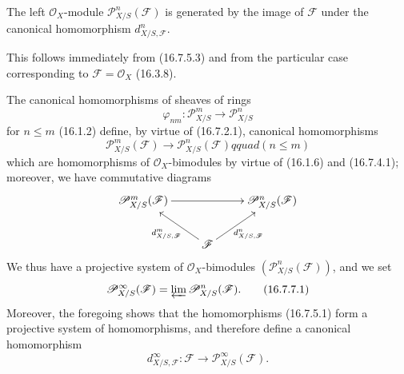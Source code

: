 \begin{proposition}[16.7.6]
\label{IV.16.7.6}
The left $\mathcal{O}_X$-module $\mathscr{P}_{X/S}^n(\mathscr{F})$ is
generated by the image of $\mathscr{F}$ under the canonical homomorphism
$d_{X/S,\mathscr{F}}^n$.
\end{proposition}

This follows immediately from (16.7.5.3) and from the particular case
corresponding to $\mathscr{F}=\mathcal{O}_X$ (16.3.8).

\begin{env}[16.7.7]
\label{IV.16.7.7}
The canonical homomorphisms of sheaves of rings
\[
  \varphi_{nm}:\mathscr{P}_{X/S}^m\longrightarrow\mathscr{P}_{X/S}^n
\]
for $n\leq m$ (16.1.2) define, by virtue of (16.7.2.1), canonical
homomorphisms
\[
  \mathscr{P}_{X/S}^m(\mathscr{F})
  \longrightarrow\mathscr{P}_{X/S}^n(\mathscr{F})qquad(n\leq m)
\]
which are homomorphisms of $\mathcal{O}_X$-bimodules by virtue of (16.1.6)
and (16.7.4.1); moreover, we have commutative diagrams
\[
  \xymatrix{
    \mathscr{P}_{X/S}^m(\mathscr{F})\ar[rr]
      &&\mathscr{P}_{X/S}^n(\mathscr{F})\\
    &\mathscr{F}\ar[ul]^-{d_{X/S,\mathscr{F}}^m}
      \ar[ur]_-{d_{X/S,\mathscr{F}}^n}
  }
\]
We thus have a projective system of $\mathcal{O}_X$-bimodules
$(\mathscr{P}_{X/S}^n(\mathscr{F}))$, and we set
\[
  \mathscr{P}_{X/S}^{\infty}(\mathscr{F})
  =\varprojlim\mathscr{P}_{X/S}^n(\mathscr{F}).
  \tag{16.7.7.1}
  \label{IV.16.7.7.1}
\]
Moreover, the foregoing shows that the homomorphisms (16.7.5.1) form a
projective system of homomorphisms, and therefore define a canonical
homomorphism
\[
  d_{X/S,\mathscr{F}}^{\infty}:\mathscr{F}
  \longrightarrow\mathscr{P}_{X/S}^{\infty}(\mathscr{F}).
  \tag{16.7.7.2}
  \label{IV.16.7.7.2}
\]
\end{env}


